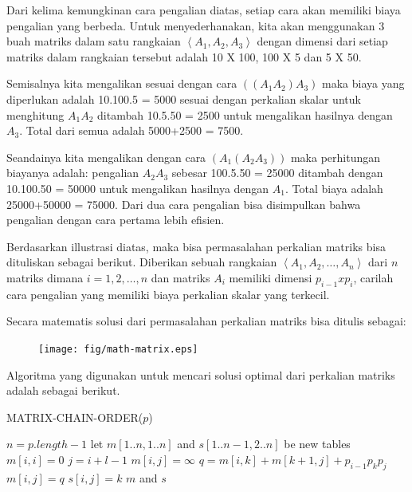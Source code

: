 Dari kelima kemungkinan cara pengalian diatas, setiap cara akan memiliki biaya pengalian yang berbeda. Untuk menyederhanakan, kita akan menggunakan 3 buah matriks dalam satu rangkaian $\left\langle A_{1},A_{2},A_{3} \right\rangle$ dengan dimensi dari setiap matriks dalam rangkaian tersebut adalah 10 X 100, 100 X 5 dan 5 X 50. 

Semisalnya kita mengalikan sesuai dengan cara $((A_{1}A_{2})A_{3})$ maka biaya yang diperlukan adalah 10.100.5 = 5000 sesuai dengan perkalian skalar untuk menghitung $A_{1}A_{2}$ ditambah 10.5.50 = 2500 untuk mengalikan hasilnya dengan $A_{3}$. Total dari semua adalah 5000+2500 = 7500.

Seandainya kita mengalikan dengan cara $(A_{1}(A_{2}A_{3}))$ maka perhitungan biayanya adalah: pengalian $A_{2}A_{3}$ sebesar 100.5.50 = 25000 ditambah dengan 10.100.50 = 50000 untuk mengalikan hasilnya dengan $A_{1}$. Total biaya adalah 25000+50000 = 75000. Dari dua cara pengalian bisa disimpulkan bahwa pengalian dengan cara pertama lebih efisien.

Berdasarkan illustrasi diatas, maka bisa permasalahan perkalian matriks bisa dituliskan sebagai berikut. Diberikan sebuah rangkaian $\left\langle A_{1},A_{2},\ldots,A_{n} \right\rangle$ dari $n$ matriks dimana $i=1,2,\ldots,n$ dan matriks $A_{i}$ memiliki dimensi $p_{i-1}xp_{i}$, carilah cara pengalian yang memiliki biaya perkalian skalar yang terkecil.

Secara matematis solusi dari permasalahan perkalian matriks bisa ditulis sebagai:

\begin{figure}
	\texttt{[image: fig/math-matrix.eps]}%
	\label{fig:math-matrix}%
\end{figure}

Algoritma yang digunakan untuk mencari solusi optimal dari perkalian matriks adalah sebagai berikut.

\begin{algorithm}
	\caption{MATRIX-CHAIN-ORDER($p$)}
	\label{algo:matrixChainOrder}
	\begin{algorithmic}[1]
		\STATE $n=p.length-1$
		\STATE let $m[1..n,1..n]$ and $s[1..n-1,2..n]$ be new tables
			\STATE $m[i,i] = 0$
		\ENDFOR
				\STATE $j=i+l-1$
				\STATE $m[i,j]=\infty$
					\STATE $q=m[i,k]+m[k+1,j]+p_{i-1}p_{k}p_{j}$
						\STATE $m[i,j]=q$
						\STATE $s[i,j]=k$
					\ENDIF			
				\ENDFOR
			\ENDFOR
		\ENDFOR
		\RETURN $m$ and $s$
	\end{algorithmic}
\end{algorithm}

